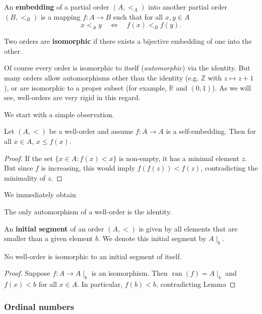 \begin{definition}An \textbf{embedding} of a partial order $(A,<_A)$ into another partial order $(B,<_B)$ is a mapping $f:A \to B$ such that for all $x,y \in A$
\begin{equation}

x <_A y \quad \iff \quad f(x) <_B f(y).
\end{equation}

Two orders are \textbf{isomorphic} if there exists a bijective embedding of one into the other.

\end{definition}Of course every order is isomorphic to itself (\textit{automorphic}) via the identity. But many orders allow automorphisms other than the identity (e.g. $\mathbb{Z}$ with $z \mapsto z+1$), or are isomorphic to a proper subset (for example, $\mathbb{R}$ and $(0,1)$). As we will see, well-orders are very rigid in this regard.

We start with a simple observation.

\begin{proposition}Let $(A,<)$ be a well-order and assume $f:A \to A$ is a self-embedding. Then for all $x \in A$, $x \leq f(x)$.

\end{proposition}\begin{proof}If the set $\{x \in A \colon f(x) < x\}$ is non-empty, it has a minimal element $z$. But since $f$ is increasing, this would imply $f(f(z)) < f(z)$, contradicting the minimality of $z$.

\end{proof}We immediately obtain

\begin{corollary}The only automorphism of a well-order is the identity.

\end{corollary}An \textbf{initial segment} of an order $(A,<)$ is given by all elements that are smaller than a given element $b$. We denote this initial segment by $A\mid_b$.

\begin{corollary}No well-order is isomorphic to an initial segment of itself.

\end{corollary}\begin{proof}Suppose $f: A \to A\mid_b$ is an isomorphism. Then $\operatorname{ran}(f) = A\mid_b$ and $f(x) < b$ for all $x \in A$. In particular, $f(b) < b$, contradicting Lemma

\end{proof}\subsubsection{Ordinal numbers}

